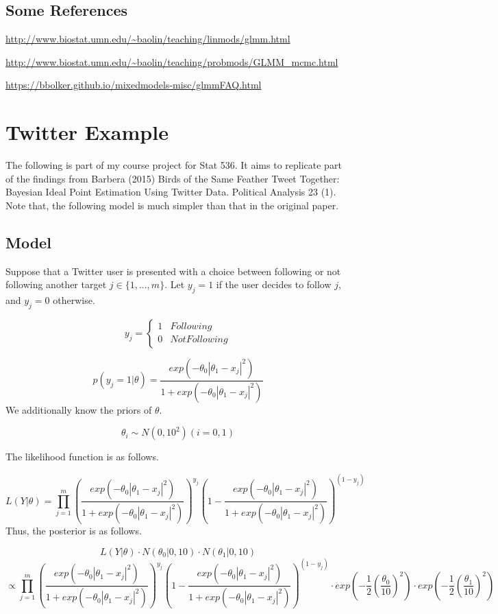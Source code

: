 \documentclass[]{book}
\begin{document}
\section{Some References}\label{some-references}

\url{http://www.biostat.umn.edu/~baolin/teaching/linmods/glmm.html}

\url{http://www.biostat.umn.edu/~baolin/teaching/probmods/GLMM_mcmc.html}

\url{https://bbolker.github.io/mixedmodels-misc/glmmFAQ.html}

\chapter{Twitter Example}\label{twitter-example}

The following is part of my course project for Stat 536. It aims to
replicate part of the findings from Barbera (2015) Birds of the Same
Feather Tweet Together: Bayesian Ideal Point Estimation Using Twitter
Data. Political Analysis 23 (1). Note that, the following model is much
simpler than that in the original paper.

\section{Model}\label{model}

Suppose that a Twitter user is presented with a choice between following
or not following another target \(j \in \{ 1, ..., m\}\). Let
\(y_{j}=1\) if the user decides to follow \(j\), and \(y_{j}=0\)
otherwise.

\[y_{j}=\begin{cases} 1 & Following \\ 0 & Not Following \end{cases}\]

\[p(y_{j}=1|\theta) = \frac{exp(- \theta_0|\theta_1 - x_j|^2)}{1+exp(- \theta_0|\theta_1 - x_j|^2)}\]
We additionally know the priors of \(\theta\).

\[\theta_i \sim N(0,10^2) (i = 0, 1)\]

The likelihood function is as follows.

\[L(Y|\theta)=\prod_{j=1}^{m} (\frac{exp(- \theta_0|\theta_1 - x_j|^2)}{1+exp(- \theta_0|\theta_1 - x_j|^2)})^{y_j}(1-\frac{exp(- \theta_0|\theta_1 - x_j|^2)}{1+exp(- \theta_0|\theta_1 - x_j|^2)})^{(1-y_j)}\]
Thus, the posterior is as follows.

\[L(Y|\theta) \cdot N(\theta_0|0,10) \cdot N(\theta_1|0,10)\]
\[\propto \prod_{j=1}^{m} (\frac{exp(- \theta_0|\theta_1 - x_j|^2)}{1+exp(- \theta_0|\theta_1 - x_j|^2)})^{y_j}(1-\frac{exp(- \theta_0|\theta_1 - x_j|^2)}{1+exp(- \theta_0|\theta_1 - x_j|^2)})^{(1-y_j)}\cdot exp(-\frac{1}{2}(\frac{\theta_0}{10})^2)\cdot exp(-\frac{1}{2}(\frac{\theta_1}{10})^2)\]
\end{document}
